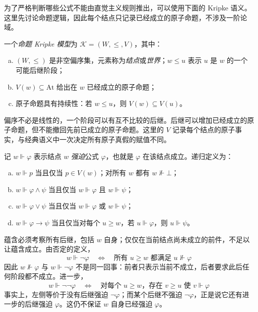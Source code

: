 \documentclass[lang=cn,a4paper,fontset=none,zihao=false,10pt,openany,twoside]{beautybook}
\numberwithin{algorithm}{chapter}
\newcommand{\At}{\mathrm{At}}
\begin{document}
\begin{readingmaterial}[title={阅读材料：Kripke 语义},title after break={阅读材料：Kripke 语义（续）}]
为了严格判断哪些公式不能由直觉主义规则推出，可以使用下面的 Kripke 语义。这里先讨论命题逻辑，因此每个结点只记录已经成立的原子命题，不涉及一阶论域。

\begin{definition}[命题 Kripke 模型]
一个\emph{命题 Kripke 模型}为 $\mathcal K=(W,\leq,V)$，其中：
\begin{enumerate}[(a)]
\item $(W,\leq)$ 是非空偏序集，元素称为\emph{结点}或\emph{世界}；$w\leq u$ 表示 $u$ 是 $w$ 的一个可能后继阶段；
\item $V(w)\subseteq\At$ 给出在 $w$ 已经成立的原子命题；
\item 原子命题具有持续性：若 $w\leq u$，则 $V(w)\subseteq V(u)$。
\end{enumerate}
\end{definition}
偏序不必是线性的，一个阶段可以有互不比较的后继。后继可以增加已经成立的原子命题，但不能撤回先前已成立的原子命题。这里的 $V$ 记录每个结点的原子事实，与经典语义中一次决定所有原子真假的赋值不同。

\begin{definition}[强迫关系]
记 $w\Vdash\varphi$ 表示结点 $w$ \emph{强迫}公式 $\varphi$，也就是 $\varphi$ 在该结点成立。递归定义为：
\begin{enumerate}[(a)]
\item $w\Vdash p$ 当且仅当 $p\in V(w)$；对所有 $w$ 都有 $w\nVdash\bot$；
\item $w\Vdash\varphi\wedge\psi$ 当且仅当 $w\Vdash\varphi$ 且 $w\Vdash\psi$；
\item $w\Vdash\varphi\vee\psi$ 当且仅当 $w\Vdash\varphi$ 或 $w\Vdash\psi$；
\item $w\Vdash\varphi\to\psi$ 当且仅当对每个 $u\geq w$，若 $u\Vdash\varphi$，则 $u\Vdash\psi$。
\end{enumerate}
\end{definition}
蕴含必须考察所有后继，包括 $w$ 自身；仅仅在当前结点尚未成立的前件，不足以让蕴含成立。由否定的定义，
\[
 w\Vdash\neg\varphi
 \quad\Longleftrightarrow\quad
 \text{所有 $u\geq w$ 都满足 $u\nVdash\varphi$}
\]
因此 $w\nVdash\varphi$ 与 $w\Vdash\neg\varphi$ 不是同一回事：前者只表示当前不成立，后者要求此后任何阶段都不成立。进一步，
\[
 w\Vdash\neg\neg\varphi
 \quad\Longleftrightarrow\quad
 \text{对每个 $u\geq w$，存在 $v\geq u$ 使 $v\Vdash\varphi$}
\]
事实上，左侧等价于没有后继强迫 $\neg\varphi$；而某个后继不强迫 $\neg\varphi$，正是说它还有进一步的后继强迫 $\varphi$。这仍不保证 $w$ 自身已经强迫 $\varphi$。


\end{readingmaterial}
\end{document}
